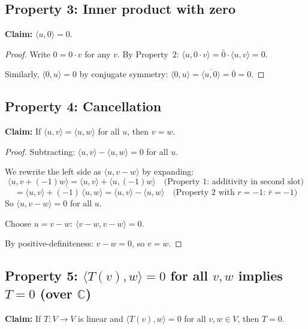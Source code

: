 \documentclass[12pt]{article}
\begin{document}
\subsection{Property 3: Inner product with zero}

\textbf{Claim:} $\langle u, 0 \rangle = 0$.

\begin{proof}
Write $0 = 0 \cdot v$ for any $v$. By Property~2:
$\langle u, 0 \cdot v \rangle = \bar{0} \cdot \langle u, v \rangle = 0$.

Similarly, $\langle 0, u \rangle = 0$ by conjugate symmetry:
$\langle 0, u \rangle = \overline{\langle u, 0 \rangle} = \overline{0} = 0$.
\end{proof}

\subsection{Property 4: Cancellation}

\textbf{Claim:} If $\langle u, v \rangle = \langle u, w \rangle$ for all $u$, then $v = w$.

\begin{proof}
Subtracting: $\langle u, v \rangle - \langle u, w \rangle = 0$ for all $u$.

We rewrite the left side as $\langle u, v - w \rangle$ by expanding:
\[
\langle u, v + (-1)w \rangle
= \langle u, v \rangle + \langle u, (-1)w \rangle
\quad \text{(Property~1: additivity in second slot)}
\]
\[
= \langle u, v \rangle + \overline{(-1)}\,\langle u, w \rangle
= \langle u, v \rangle - \langle u, w \rangle
\quad \text{(Property~2 with $r = -1$: $\bar{r} = -1$)}
\]
So $\langle u, v - w \rangle = 0$ for all $u$.

Choose $u = v - w$:
$\langle v-w, v-w \rangle = 0$.

By positive-definiteness: $v - w = 0$, so $v = w$.
\end{proof}

\subsection{Property 5: $\langle T(v), w \rangle = 0$ for all $v, w$ implies $T = 0$ (over $\mathbb{C}$)}

\textbf{Claim:} If $T: V \to V$ is linear and $\langle T(v), w \rangle = 0$ for all $v, w \in V$, then $T = 0$.
\end{document}
